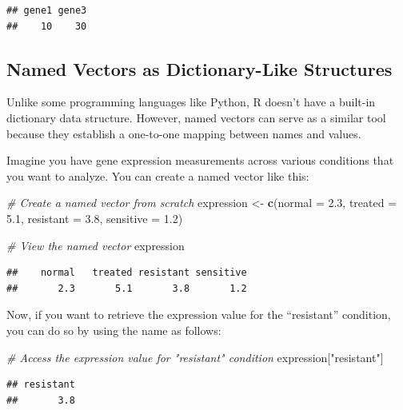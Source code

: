 \documentclass[
]{book}
\newenvironment{Shaded}{\begin{snugshade}}{\end{snugshade}}
\newcommand{\AttributeTok}[1]{\textcolor[rgb]{0.13,0.29,0.53}{#1}}
\newcommand{\CommentTok}[1]{\textcolor[rgb]{0.56,0.35,0.01}{\textit{#1}}}
\newcommand{\FloatTok}[1]{\textcolor[rgb]{0.00,0.00,0.81}{#1}}
\newcommand{\FunctionTok}[1]{\textcolor[rgb]{0.13,0.29,0.53}{\textbf{#1}}}
\newcommand{\NormalTok}[1]{#1}
\newcommand{\OtherTok}[1]{\textcolor[rgb]{0.56,0.35,0.01}{#1}}
\newcommand{\StringTok}[1]{\textcolor[rgb]{0.31,0.60,0.02}{#1}}
\begin{document}
\begin{verbatim}
## gene1 gene3 
##    10    30
\end{verbatim}

\hypertarget{named-vectors-as-dictionary-like-structures}{%
\subsection{Named Vectors as Dictionary-Like Structures}\label{named-vectors-as-dictionary-like-structures}}

Unlike some programming languages like Python, R doesn't have a built-in dictionary data structure. However, named vectors can serve as a similar tool because they establish a one-to-one mapping between names and values.

Imagine you have gene expression measurements across various conditions that you want to analyze. You can create a named vector like this:

\begin{Shaded}
\begin{Highlighting}[]
\CommentTok{\# Create a named vector from scratch}
\NormalTok{expression }\OtherTok{\textless{}{-}} \FunctionTok{c}\NormalTok{(}\AttributeTok{normal =} \FloatTok{2.3}\NormalTok{, }\AttributeTok{treated =} \FloatTok{5.1}\NormalTok{, }\AttributeTok{resistant =} \FloatTok{3.8}\NormalTok{, }\AttributeTok{sensitive =} \FloatTok{1.2}\NormalTok{)}

\CommentTok{\# View the named vector}
\NormalTok{expression}
\end{Highlighting}
\end{Shaded}

\begin{verbatim}
##    normal   treated resistant sensitive 
##       2.3       5.1       3.8       1.2
\end{verbatim}

Now, if you want to retrieve the expression value for the ``resistant'' condition, you can do so by using the name as follows:

\begin{Shaded}
\begin{Highlighting}[]
\CommentTok{\# Access the expression value for "resistant" condition}
\NormalTok{expression[}\StringTok{"resistant"}\NormalTok{]}
\end{Highlighting}
\end{Shaded}

\begin{verbatim}
## resistant 
##       3.8
\end{verbatim}
\end{document}
